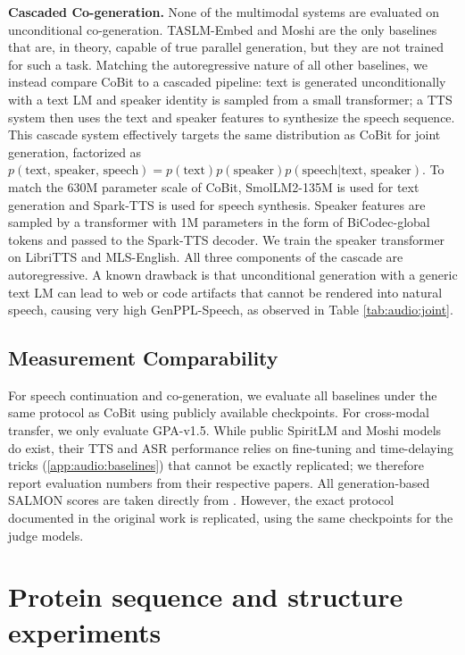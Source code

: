 \textbf{Cascaded Co-generation.} None of the multimodal systems are evaluated on unconditional co-generation. TASLM-Embed and Moshi are the only baselines that are, in theory, capable of true parallel generation, but they are not trained for such a task. Matching the autoregressive nature of all other baselines, we instead compare CoBit to a cascaded pipeline: text is generated unconditionally with a text LM and speaker identity is sampled from a small transformer; a TTS system then uses the text and speaker features to synthesize the speech sequence. This cascade system effectively targets the same distribution as CoBit for joint generation, factorized as $p(\text{text, speaker, speech}) = p(\text{text})p(\text{speaker})p(\text{speech}|\text{text, speaker})$. To match the $630$M parameter scale of CoBit, SmolLM2-135M \citep{audio:smollm} is used for text generation and Spark-TTS \citep{audio:spark-tts} is used for speech synthesis. Speaker features are sampled by a transformer with 1M parameters in the form of BiCodec-global tokens and passed to the Spark-TTS decoder. We train the speaker transformer on LibriTTS and MLS-English. All three components of the cascade are autoregressive. A known drawback is that unconditional generation with a generic text LM can lead to web or code artifacts that cannot be rendered into natural speech, causing very high GenPPL-Speech, as observed in Table \ref{tab:audio:joint}.

\subsection{Measurement Comparability} \label{app:audio:comparability}

For speech continuation and co-generation, we evaluate all baselines under the same protocol as CoBit using publicly available checkpoints. For cross-modal transfer, we only evaluate GPA-v1.5. While public SpiritLM and Moshi models do exist, their TTS and ASR performance relies on fine-tuning and time-delaying tricks (\ref{app:audio:baselines}) that cannot be exactly replicated; we therefore report evaluation numbers from their respective papers. All generation-based SALMON scores are taken directly from \cite{audio:gen-salmon}. However, the exact protocol documented in the original work is replicated, using the same checkpoints for the judge models.
 
\section{Protein sequence and structure experiments}
\label{app:protein}
